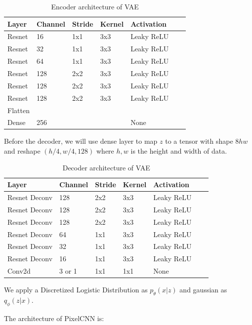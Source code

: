 \documentclass[a3paper]{article}
\begin{document}
\begin{table}[H]
\centering
\begin{tabular}{lllllll}
Layer     & Channel & Stride & Kernel & Activation  \\
\toprule
Resnet & 16 & 1x1 & 3x3 & Leaky ReLU \\
Resnet & 32 & 1x1 & 3x3 & Leaky ReLU \\
Resnet & 64 & 1x1 & 3x3 & Leaky ReLU \\
Resnet & 128 & 2x2 & 3x3 & Leaky ReLU \\
Resnet & 128 & 2x2 & 3x3 & Leaky ReLU \\
Resnet & 128 & 2x2 & 3x3 & Leaky ReLU \\
Flatten & \\
Dense & 256 &  &  & None \\
\bottomrule
\end{tabular}
\caption{Encoder architecture of VAE}
\end{table}

Before the decoder, we will use dense layer to map $z$ to a tensor with shape $8hw$ and reshape $(h / 4, w / 4, 128)$ where $h, w$ is the height and width of data. 

\begin{table}[H]
\centering
\begin{tabular}{lllllll}
Layer     & Channel & Stride & Kernel & Activation  \\
\toprule
Resnet Deconv & 128 & 2x2 & 3x3 & Leaky ReLU \\
Resnet Deconv & 128 & 2x2 & 3x3 & Leaky ReLU \\
Resnet Deconv & 128 & 2x2 & 3x3 & Leaky ReLU \\
Resnet Deconv & 64 & 1x1 & 3x3 & Leaky ReLU \\
Resnet Deconv & 32 & 1x1 & 3x3 & Leaky ReLU \\
Resnet Deconv & 16 & 1x1 & 3x3 & Leaky ReLU \\
Conv2d & 3 or 1 & 1x1 & 1x1 & None \\
\bottomrule
\end{tabular}
\caption{Decoder architecture of VAE}
\end{table}
We apply a Discretized Logistic Distribution as $p_\theta(x|z)$ and gaussian as $q_\phi(z|x)$. 


The architecture of PixelCNN is: 
\end{document}
